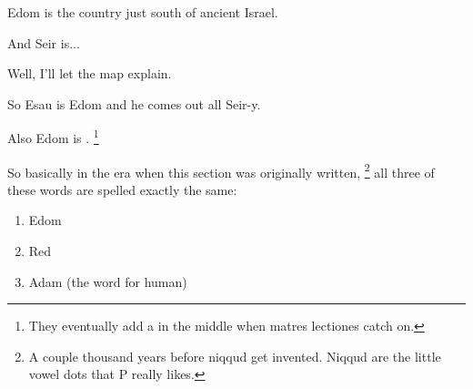 {{	Edom is the country just south of ancient Israel.

	And Seir is...

	Well, I'll let the map explain.

	\par\nopagebreak[4]
	\begin{center}
	\end{center}

	So Esau is Edom and he comes out all Seir-y.

	Also Edom is .%
	\footnote{They eventually add a  in the middle when matres lectiones catch on.}

	So basically in the era when this section was originally written,%
	\footnote{
		A couple thousand years before niqqud get invented.
		Niqqud are the little vowel dots that P really likes.
	} all three of these words are spelled exactly the same:

	\begin{enumerate}
	\item Edom
	\item Red
	\item Adam (the word for human)
	\end{enumerate}
	}
}

